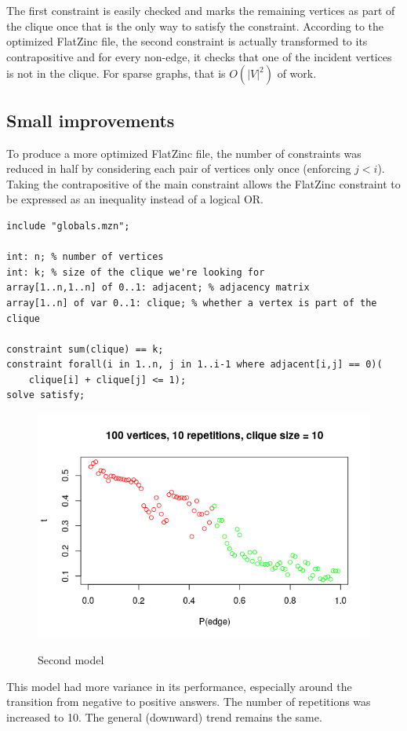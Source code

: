 \documentclass{article}
\begin{document}
The first constraint is easily checked and marks the remaining vertices as part of the clique once that is the only way to satisfy the constraint. According to the optimized FlatZinc file, the second constraint is actually transformed to its contrapositive and for every non-edge, it checks that one of the incident vertices is not in the clique. For sparse graphs, that is $O(|V|^2)$ of work.
\subsection{Small improvements}
To produce a more optimized FlatZinc file, the number of constraints was reduced in half by considering each pair of vertices only once (enforcing $j<i$). Taking the contrapositive of the main constraint allows the FlatZinc constraint to be expressed as an inequality instead of a logical OR.
\begin{lstlisting}
include "globals.mzn";

int: n; % number of vertices
int: k; % size of the clique we're looking for
array[1..n,1..n] of 0..1: adjacent; % adjacency matrix
array[1..n] of var 0..1: clique; % whether a vertex is part of the clique

constraint sum(clique) == k;
constraint forall(i in 1..n, j in 1..i-1 where adjacent[i,j] == 0)(
    clique[i] + clique[j] <= 1);
solve satisfy;
\end{lstlisting}
\begin{figure}
  \includegraphics[scale=0.5]{max_clique2.png}
  \label{fig:second_max_clique}
  \caption{Second model}
\end{figure}
This model had more variance in its performance, especially around the transition from negative to positive answers. The number of repetitions was increased to 10. The general (downward) trend remains the same.
\end{document}
